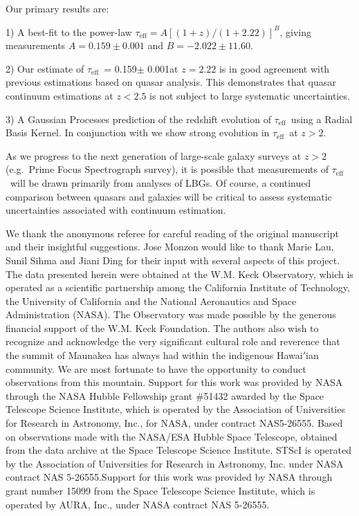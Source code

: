 \documentclass[twocolumn,tight,times]{aastex63}
\newcommand{\mteff}{\tau_\mathrm{eff}}
\newcommand{\teff}{$\mteff$}
\newcommand{\Aval}{0.159}  %
\newcommand{\Aerr}{0.001}  %
\newcommand{\Bval}{-2.022}  %
\newcommand{\Berr}{11.60}  %
\begin{document}
Our primary results are:

1) A best-fit to the power-law $\mteff = A[(1+z)/(1+2.22)]^{B}$, giving measurements $A = \Aval \pm \Aerr$ and $B = \Bval \pm \Berr$.

2) Our estimate of \teff\ = \Aval $\pm$ \Aerr at $z = 2.22$ is in good agreement with previous estimations based on quasar analysis. This demonstrates that quasar continuum estimations at $z<2.5$ is not subject to large systematic uncertainties.

3) A Gaussian Processes prediction of the redshift evolution of \teff\ using a Radial Basis Kernel. In conjunction with \cite{Schaye_2003, Kirkman_2005, Becker_2013} we show strong evolution in \teff\ at $z > 2$.

As we progress to the next generation of large-scale galaxy surveys at $z>2$ (e.g.\ Prime Focus Spectrograph survey), it is possible that measurements of \teff\ will be drawn primarily from analyses of LBGs. Of course, a continued comparison between quasars and galaxies will
be critical to assess systematic uncertainties associated with continuum estimation.
 
\begin{acknowledgements}

We thank the anonymous referee for careful reading of the original manuscript and their insightful suggestions. Jose Monzon would like to thank Marie Lau, Sunil Sihma and Jiani Ding for their input with several aspects of this project. The data presented herein were obtained at the W.M. Keck Observatory, which is operated as a scientific partnership among the California Institute of Technology, the University of California and the National Aeronautics and Space Administration (NASA). The Observatory was made possible by the generous financial support of the W.M. Keck Foundation. The authors also wish to recognize and acknowledge the very significant cultural role and reverence that the summit of Maunakea has always had within the indigenous Hawai$'$ian community. We are most fortunate to have the opportunity to conduct observations from this mountain. Support for this work was provided by NASA through the NASA Hubble Fellowship grant \#51432 awarded by the Space Telescope Science Institute, which is operated by the Association of Universities for Research in Astronomy, Inc., for NASA, under contract NAS5-26555. Based on observations made with the NASA/ESA Hubble Space Telescope, obtained from the data archive at the Space Telescope Science Institute. STScI is operated by the Association of Universities for Research in Astronomy, Inc. under NASA contract NAS 5-26555.Support for this work was provided by NASA through grant number 15099 from the Space Telescope Science Institute, which is operated by AURA, Inc., under NASA contract NAS 5-26555.

\end{acknowledgements}
\end{document}
